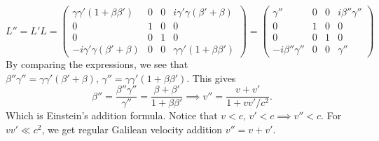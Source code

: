 \documentclass{article}
\begin{document}
        \begin{equation*}
            L'' = L' L = 
            \begin{pmatrix*}
                \gamma \gamma'(1 + \beta \beta') & 0 & 0 & i \gamma' \gamma (\beta'+ \beta) \\
                0 & 1 &  0 & 0 \\
                0 & 0 & 1 & 0 \\
                -i\gamma' \gamma(\beta' + \beta ) & 0 & 0 & \gamma \gamma' (1 + \beta \beta')               
            \end{pmatrix*}
             = 
             \begin{pmatrix*}
                \gamma'' & 0 & 0 & i \beta'' \gamma'' \\
                0 & 1 &  0 & 0 \\
                0 & 0 & 1 & 0 \\
                -i\beta'' \gamma'' & 0 & 0 & \gamma''
            \end{pmatrix*}
        \end{equation*}
        By comparing the expressions, we see that $\beta'' \gamma'' = \gamma \gamma'(\beta' + \beta ), \, \gamma'' = \gamma \gamma' (1 + \beta \beta')$. This gives
        \begin{equation*}
            \beta'' = \frac{\beta '' \gamma''}{\gamma''} = \frac{\beta  + \beta'}{1 + \beta \beta '} \implies v'' = \frac{v + v'}{1 + v v' / c^2}.
        \end{equation*}
        Which is Einstein's addition formula. Notice that $v<c,\, v'< c \implies v'' < c$. For $vv' \ll c^2$, we get regular Galilean velocity addition $v'' = v + v'$.
\end{document}
